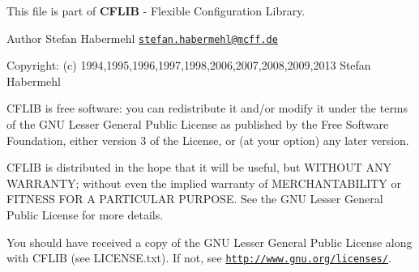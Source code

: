 This file is part of {\bfseries C\-F\-L\-I\-B} -\/ Flexible Configuration Library.

\begin{DoxyAuthor}{Author}
Stefan Habermehl \href{mailto:stefan.habermehl@mcff.de}{\tt stefan.\-habermehl@mcff.\-de}
\end{DoxyAuthor}
\begin{DoxyParagraph}{Copyright\-:}
(c) 1994,1995,1996,1997,1998,2006,2007,2008,2009,2013 Stefan Habermehl
\end{DoxyParagraph}
C\-F\-L\-I\-B is free software\-: you can redistribute it and/or modify it under the terms of the G\-N\-U Lesser General Public License as published by the Free Software Foundation, either version 3 of the License, or (at your option) any later version.

C\-F\-L\-I\-B is distributed in the hope that it will be useful, but W\-I\-T\-H\-O\-U\-T A\-N\-Y W\-A\-R\-R\-A\-N\-T\-Y; without even the implied warranty of M\-E\-R\-C\-H\-A\-N\-T\-A\-B\-I\-L\-I\-T\-Y or F\-I\-T\-N\-E\-S\-S F\-O\-R A P\-A\-R\-T\-I\-C\-U\-L\-A\-R P\-U\-R\-P\-O\-S\-E. See the G\-N\-U Lesser General Public License for more details.

You should have received a copy of the G\-N\-U Lesser General Public License along with C\-F\-L\-I\-B (see L\-I\-C\-E\-N\-S\-E.\-txt). If not, see \href{http://www.gnu.org/licenses/}{\tt http\-://www.\-gnu.\-org/licenses/}.


